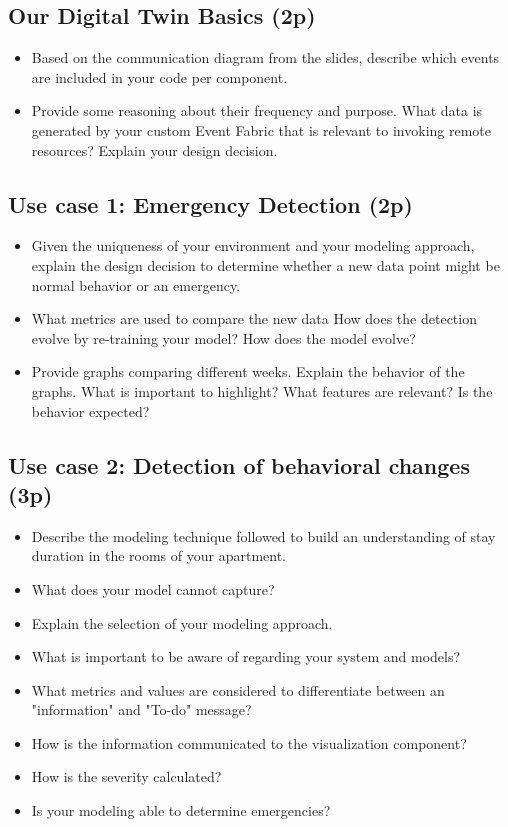 \documentclass[A4,10pt]{article}
\begin{document}
\subsection{Our Digital Twin Basics (2p)}

\begin{itemize}
	\item Based on the communication diagram from the slides, describe which events are included in your code per component.
	\item Provide some reasoning about their frequency and purpose. What data is generated by your custom Event Fabric that is relevant to invoking remote resources? Explain your design decision.
\end{itemize}


\subsection{Use case 1: Emergency Detection (2p)}

\begin{itemize}
	\item Given the uniqueness of your environment and your modeling approach, explain the design decision to determine whether a new data point might be normal behavior or an emergency.
	\item What metrics are used to compare the new data How does the detection evolve by re-training your model? How does the model evolve?
	\item Provide graphs comparing different weeks. Explain the behavior of the graphs. What is important to highlight? What features are relevant? Is the behavior expected?
\end{itemize}


\subsection{ Use case 2: Detection of behavioral changes (3p)}

\begin{itemize}
	\item Describe the modeling technique followed to build an understanding of stay duration in the rooms of your apartment.
	\item What does your model cannot capture?
	\item Explain the selection of your modeling approach.
	\item What is important to be aware of regarding your system and models?
	\item What metrics and values are considered to differentiate between an "information" and "To-do" message?
	\item How is the information communicated to the visualization component?
	\item How is the severity calculated? 
	\item Is your modeling able to determine emergencies?
\end{itemize}
\end{document}

